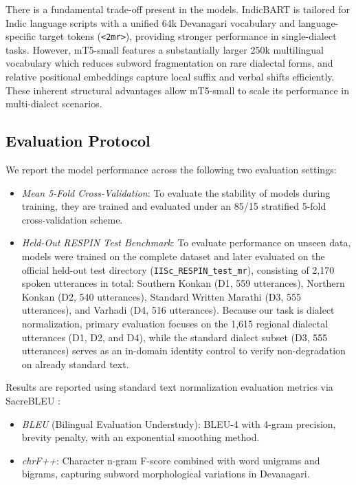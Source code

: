 \documentclass[11pt, a4paper]{article}
\begin{document}
There is a fundamental trade-off present in the models. IndicBART is tailored for Indic language scripts with a unified 64k Devanagari vocabulary and language-specific target tokens (\texttt{<2mr>}), providing stronger performance in single-dialect tasks. However, mT5-small features a substantially larger 250k multilingual vocabulary which reduces subword fragmentation on rare dialectal forms, and relative positional embeddings capture local suffix and verbal shifts efficiently. These inherent structural advantages allow mT5-small to scale its performance in multi-dialect scenarios.

\subsection{\textcolor{black}{Evaluation Protocol}}

We report the model performance across the following two evaluation settings:
\begin{itemize}
    \item {\fontsize{11pt}{14pt}\selectfont\itshape Mean 5-Fold Cross-Validation}: To evaluate the stability of models during training, they are trained and evaluated under an 85/15 stratified 5-fold cross-validation scheme.
    \item {\fontsize{11pt}{14pt}\selectfont\itshape Held-Out RESPIN Test Benchmark}: To evaluate performance on unseen data, models were trained on the complete dataset and later evaluated on the official held-out test directory (\texttt{IISc\_RESPIN\_test\_mr}), consisting of 2,170 spoken utterances in total: Southern Konkan (D1, 559 utterances), Northern Konkan (D2, 540 utterances), Standard Written Marathi (D3, 555 utterances), and Varhadi (D4, 516 utterances). Because our task is dialect normalization, primary evaluation focuses on the 1,615 regional dialectal utterances (D1, D2, and D4), while the standard dialect subset (D3, 555 utterances) serves as an in-domain identity control to verify non-degradation on already standard text.
\end{itemize}

Results are reported using standard text normalization evaluation metrics via SacreBLEU \citep{post2018sacrebleu}:
\begin{itemize}
    \item {\fontsize{11pt}{14pt}\selectfont\itshape BLEU} (Bilingual Evaluation Understudy): BLEU-4 with 4-gram precision, brevity penalty, with an exponential smoothing method.
    \item {\fontsize{11pt}{14pt}\selectfont\itshape chrF++}: Character n-gram F-score combined with word unigrams and bigrams, capturing subword morphological variations in Devanagari.
\end{itemize}
\end{document}
